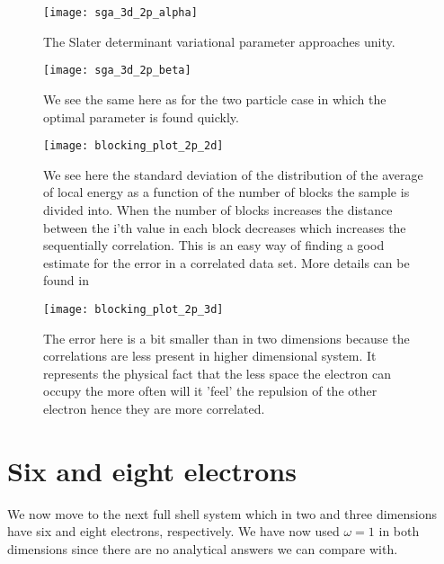 \clearpage

\begin{figure}[!p]
  \begin{center}
    \texttt{[image: sga\_3d\_2p\_alpha]}
  \end{center}
  \caption{The Slater determinant variational parameter approaches unity.}
\label{fig:sga_3d_2p_alpha}
\end{figure}

\begin{figure}[!p]
  \begin{center}
    \texttt{[image: sga\_3d\_2p\_beta]}
  \end{center}
  \caption{We see the same here as for the two particle case in which the optimal parameter is found quickly.}
  \label{fig:sga_3d_2p_beta}
\end{figure}

\clearpage

\begin{figure}[!p]
  \begin{center}
    \texttt{[image: blocking\_plot\_2p\_2d]}
  \end{center}
  \caption{We see here the standard deviation of the distribution of the average of local energy as a function of the number of blocks the sample is divided into. When the number of blocks increases the distance between the i'th value in each block decreases which increases the sequentially correlation. This is an easy way of finding a good estimate for the error in a correlated data set. More details can be found in \cite{article:Blocking}}
  \label{fig:blocking_plot_2p_2d}
\end{figure}

\begin{figure}[!p]
  \begin{center}
    \texttt{[image: blocking\_plot\_2p\_3d]}
  \end{center}
  \caption{The error here is a bit smaller than in two dimensions because the correlations are less present in higher dimensional system. It represents the physical fact that the less space the electron can occupy the more often will it 'feel' the repulsion of the other electron hence they are more correlated.}
  \label{fig:blocking_plot_2p_3d}
\end{figure}

\clearpage

\section{Six and eight electrons}
We now move to the next full shell system which in two and three dimensions have six and eight electrons, respectively. We have now used $\omega=1$ in both dimensions since there are no analytical answers we can compare with. 

